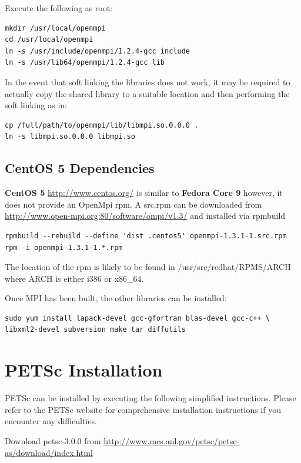 \documentclass[12pt]{article}
\begin{document}
Execute the following as root:

\begin{Verbatim}
mkdir /usr/local/openmpi
cd /usr/local/openmpi
ln -s /usr/include/openmpi/1.2.4-gcc include
ln -s /usr/lib64/openmpi/1.2.4-gcc lib
\end{Verbatim}

In the event that soft linking the libraries does not work, it may be
required to actually copy the shared library to a suitable location
and then performing the soft linking as in:

\begin{Verbatim}
cp /full/path/to/openmpi/lib/libmpi.so.0.0.0 .
ln -s libmpi.so.0.0.0 libmpi.so
\end{Verbatim}


\subsection{CentOS 5 Dependencies}

\textbf{CentOS 5} \url{http://www.centos.org/} is similar to \textbf{Fedora
Core 9} however, it does not provide an OpenMpi rpm.  A src.rpm can be
downloaded from \url{http://www.open-mpi.org:80/software/ompi/v1.3/}
and installed via rpmbuild

\begin{Verbatim}
rpmbuild --rebuild --define 'dist .centos5' openmpi-1.3.1-1.src.rpm
rpm -i openmpi-1.3.1-1.*.rpm
\end{Verbatim}
The location of the rpm is likely to be found in
/usr/src/redhat/RPMS/ARCH where ARCH is either i386 or x86\_64.

Once MPI has been built, the other libraries can be installed:
\begin{verbatim}
sudo yum install lapack-devel gcc-gfortran blas-devel gcc-c++ \
libxml2-devel subversion make tar diffutils
\end{verbatim}


\section{PETSc Installation}

PETSc can be installed by executing the following simplified
instructions.  Please refer to the PETSc website for comprehensive
installation instructions if you encounter any difficulties.

Download petsc-3.0.0 from
\url{http://www.mcs.anl.gov/petsc/petsc-as/download/index.html}
\end{document}
